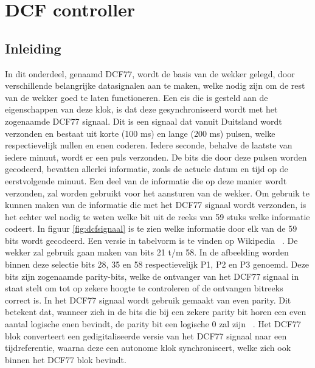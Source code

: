 \chapter{DCF controller}
\section{Inleiding}
In dit onderdeel, genaamd DCF77,  wordt de basis van de wekker gelegd, door verschillende belangrijke datasignalen aan te maken, welke nodig zijn om de rest van de wekker goed te laten functioneren. Een eis die is gesteld aan de eigenschappen van deze klok, is dat deze gesynchroniseerd wordt met het zogenaamde DCF77 signaal. Dit is een signaal dat vanuit Duitsland wordt verzonden en bestaat uit korte (100 ms) en lange (200 ms) pulsen, welke respectievelijk nullen en enen coderen. Iedere seconde, behalve de laatste van iedere minuut, wordt er een puls verzonden. De bits die door deze pulsen worden gecodeerd, bevatten allerlei informatie, zoals de actuele datum en tijd op de eerstvolgende minuut. Een deel van de informatie die op deze manier wordt verzonden, zal worden gebruikt voor het aansturen van de wekker. Om gebruik te kunnen maken van de informatie die met het DCF77 signaal wordt verzonden, is het echter wel nodig te weten welke bit uit de reeks van 59 stuks welke informatie codeert. In figuur \ref{fig:dcfsignaal} is te zien welke informatie door elk van de 59 bits wordt gecodeerd. Een versie in tabelvorm is te vinden op Wikipedia ~\cite{Tijdwiki}. De wekker zal gebruik gaan maken van bits 21 t/m 58. In de afbeelding worden binnen deze selectie bits 28, 35 en 58 respectievelijk P1, P2 en P3 genoemd. Deze bits zijn zogenaamde parity-bits, welke de ontvanger van het DCF77 signaal in staat stelt om tot op zekere hoogte te controleren of de ontvangen bitreeks correct is. In het DCF77 signaal wordt gebruik gemaakt van even parity. Dit betekent dat, wanneer zich in de bits die bij een zekere parity bit horen een even aantal logische enen bevindt, de parity bit een logische 0 zal zijn ~\cite{Tijdscodering}. Het DCF77 blok converteert een gedigitaliseerde versie van het DCF77 signaal naar een tijdreferentie, waarna deze een autonome klok synchroniseert, welke zich ook binnen het DCF77 blok bevindt.

